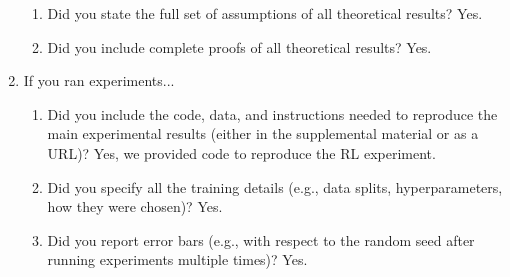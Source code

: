 \begin{enumerate}
\begin{enumerate}
\item  Did you state the full set of assumptions of all theoretical results?
Yes.


\item  Did you include complete proofs of all theoretical results?
Yes.


\end{enumerate}
\item If you ran experiments...
\begin{enumerate}
\item  Did you include the code, data, and instructions needed to reproduce the main experimental results (either in the supplemental material or as a URL)?
Yes, we provided code to reproduce the RL experiment.






\item Did you specify all the training details (e.g., data splits, hyperparameters, how they were chosen)?
Yes.


\item  Did you report error bars (e.g., with respect to the random seed after running experiments multiple times)?
Yes.


\end{enumerate}
\end{enumerate}
